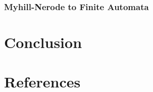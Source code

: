 \documentclass[11pt,a4paper,oneside]{book}
\begin{document}
            \subsection{Myhill-Nerode to Finite Automata}

                \paragraph{}


    \chapter{Conclusion}

    \chapter{References}

    {}
    
\end{document}
